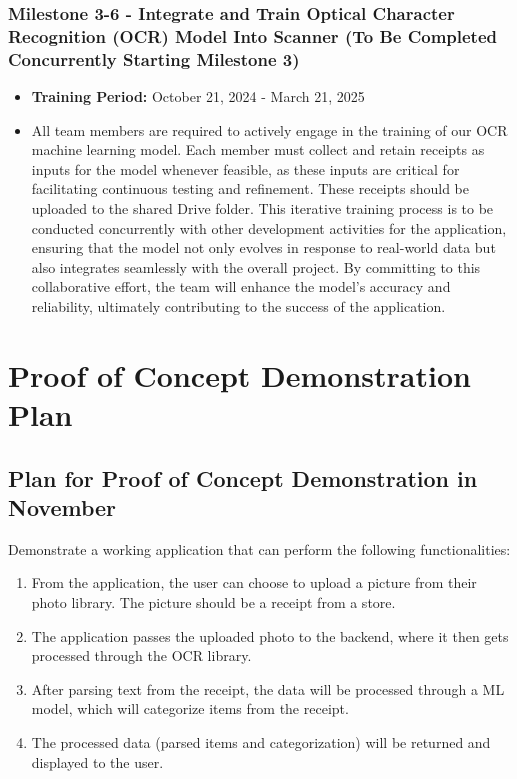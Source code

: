 \documentclass{article}
\begin{document}
\subsubsection*{Milestone 3-6 - Integrate and Train Optical Character Recognition (OCR) Model Into Scanner (To Be Completed Concurrently Starting Milestone 3)}
\begin{itemize}
    \item \textbf{Training Period:} October 21, 2024 - March 21, 2025
    \item All team members are required to actively engage in the training of
    our OCR machine learning model. Each member must collect and retain receipts
    as inputs for the model whenever feasible, as these inputs are critical for
    facilitating continuous testing and refinement. These receipts should be
    uploaded to the shared Drive folder. This iterative training process is to
    be conducted concurrently with other development activities for the
    application, ensuring that the model not only evolves in response to
    real-world data but also integrates seamlessly with the overall project. By
    committing to this collaborative effort, the team will enhance the model's
    accuracy and reliability, ultimately contributing to the success of the
    application.
\end{itemize}

\newpage

\section{Proof of Concept Demonstration Plan}

\subsection{Plan for Proof of Concept Demonstration in November}
Demonstrate a working application that can perform the following
functionalities:
\begin{enumerate}
    \item From the application, the user can choose to upload a picture from
    their photo library. The picture should be a receipt from a store.
    \item The application passes the uploaded photo to the backend, where it
    then gets processed through the OCR library.
    \item After parsing text from the receipt, the data will be processed
    through a ML model, which will categorize items from the receipt.
    \item The processed data (parsed items and categorization) will be returned
    and displayed to the user.
\end{enumerate}
\end{document}
